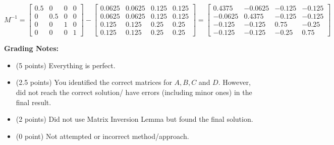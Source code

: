 \documentclass[letterpaper]{article}
\begin{document}
$$M^{-1}= \begin{bmatrix} 0.5 &0 & 0 & 0\\ 0 &  0.5& 0 & 0\\ 0 & 0 & 1 & 0\\ 0 & 0 & 0 & 1
\end{bmatrix} - \begin{bmatrix} 0.0625 &0.0625 & 0.125 & 0.125\\ 0.0625 &0.0625 & 0.125 & 0.125\\ 0.125 & 0.125 & 0.25 & 0.25\\ 0.125 & 0.125 & 0.25 & 0.25
\end{bmatrix} = \begin{bmatrix} 0.4375 &-0.0625 & -0.125 & -0.125\\ -0.0625 &0.4375 & -0.125 & -0.125\\ -0.125 & -0.125 & 0.75 & -0.25\\ -0.125 & -0.125 & -0.25 & 0.75
\end{bmatrix}$$

\noindent \textbf{Grading Notes:}
\begin{itemize}
  \item (5 points) Everything is perfect.
  \item (2.5 points) You identified the correct matrices for $A, B, C$ and $D$. However, did not reach the correct solution/ have errors (including minor ones) in the final result.
  \item (2 points) Did not use Matrix Inversion Lemma but found the final solution.
  \item (0 point) Not attempted or incorrect method/approach.
\end{itemize}
\end{document}
